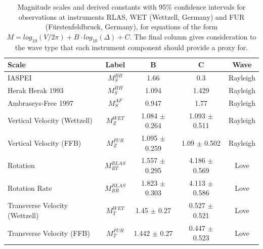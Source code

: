 \documentclass{gji}
\begin{document}
\begin{table}
\begin{minipage}{115mm}
	\begin{center}
		\begin{tabular}{ |l|c|c|c|c| } 
		        \bf{Scale} & \bf{Label} & \bf{B} & \bf{C}  & \bf{Wave}\\ \hline
        IASPEI & $M_{S}^{BB}$ & 1.66 & 0.3  & Rayleigh \\ \hline
        Herak Herak 1993 & $M_{S}^{HH}$ & 1.094 & 1.429  & Rayleigh \\ \hline
        Ambraseys-Free 1997 & $M_{S}^{AF}$ & 0.947 & 1.77  & Rayleigh \\ \hline
        Vertical Velocity (Wettzell) & $M^{WET}_Z$ & 1.084 $\pm$ 0.264 & 1.093 $\pm$ 0.511  & Rayleigh \\ \hline
        Vertical Velocity (FFB) & $M^{FUR}_Z$ & 1.095 $\pm$ 0.259 & 1.09 $\pm$ 0.502  & Rayleigh \\ \hline
        Rotation  & $M^{RLAS}_{RT}$ & 1.557 $\pm$ 0.295 & 4.186 $\pm$ 0.569  & Love \\ \hline
        Rotation Rate & $M^{RLAS}_{RR}$ & 1.823 $\pm$ 0.303 & 4.113 $\pm$ 0.586  & Love\\ \hline 
        Transverse Velocity (Wettzell) & $M^{WET}_T$ & 1.45 $\pm$ 0.27 & 0.527 $\pm$ 0.521 & Love \\ \hline
        Transverse Velocity (FFB) & $M^{FUR}_T$ & 1.442 $\pm$ 0.27 & 0.447 $\pm$ 0.523 & Love \\ \hline

		\end{tabular}
		
    		\caption{Magnitude scales and derived constants with 95\% confidence intervals for observations at instruments RLAS, WET (Wettzell, Germany) and FUR (F\"urstenfeldbruck, Germany), for equations of the form $M = log_{10}(V/2\pi) + B\cdot log_{10}(\Delta) + C$. The final column gives consideration to the wave type that each instrument component should provide a proxy for.}
		\label{tab:scales}
	\end{center}
	\end{minipage}
\end{table}
\end{document}
